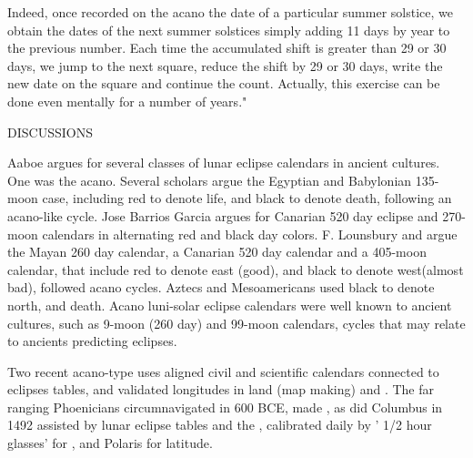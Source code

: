 \documentclass[12pt]{article}
\begin{document}
Indeed, once recorded on the acano the date of a particular summer solstice, we obtain the dates of the next summer solstices simply adding 11 days by year to the previous number. Each time the accumulated shift is greater than 29 or 30 days, we jump to the next square, reduce the shift by 29 or 30 days, write the new date on the square and continue the count. Actually, this exercise can be done even mentally for a number of years." 

DISCUSSIONS

Aaboe argues for several classes of lunar eclipse calendars in ancient cultures.  One was the acano. Several scholars argue the Egyptian and Babylonian 135-moon case, including red to denote life, and black to denote death, following an acano-like cycle. Jose Barrios Garcia argues for Canarian 520 day eclipse and 270-moon calendars in alternating red and black day colors. F. Lounsbury and  argue the Mayan 260 day calendar, a Canarian 520 day calendar and a 405-moon calendar, that include red to denote east (good), and black to denote west(almost bad), followed acano cycles. Aztecs and Mesoamericans used black to denote north, and death. Acano luni-solar eclipse calendars were well known to ancient cultures, such as 9-moon (260 day) and 99-moon calendars, cycles that may relate to ancients predicting eclipses.  

Two recent acano-type uses aligned civil and scientific calendars connected to eclipses tables, and validated longitudes in land (map making) and . The far ranging Phoenicians circumnavigated  in 600 BCE, made , as did Columbus in 1492 assisted by lunar eclipse tables and the , calibrated daily by ' 1/2 hour glasses' for , and Polaris for latitude.
\end{document}
